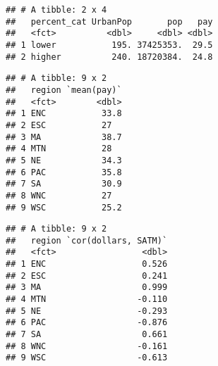 \documentclass[
]{article}
\newenvironment{Shaded}{\begin{snugshade}}{\end{snugshade}}
\newcommand{\KeywordTok}[1]{\textcolor[rgb]{0.13,0.29,0.53}{\textbf{#1}}}
\newcommand{\NormalTok}[1]{#1}
\newcommand{\OperatorTok}[1]{\textcolor[rgb]{0.81,0.36,0.00}{\textbf{#1}}}
\newcommand{\StringTok}[1]{\textcolor[rgb]{0.31,0.60,0.02}{#1}}
\begin{document}
\begin{Shaded}
\end{Shaded}

\begin{verbatim}
## # A tibble: 2 x 4
##   percent_cat UrbanPop       pop   pay
##   <fct>          <dbl>     <dbl> <dbl>
## 1 lower           195. 37425353.  29.5
## 2 higher          240. 18720384.  24.8
\end{verbatim}

\begin{Shaded}
\end{Shaded}

\begin{verbatim}
## # A tibble: 9 x 2
##   region `mean(pay)`
##   <fct>        <dbl>
## 1 ENC           33.8
## 2 ESC           27  
## 3 MA            38.7
## 4 MTN           28  
## 5 NE            34.3
## 6 PAC           35.8
## 7 SA            30.9
## 8 WNC           27  
## 9 WSC           25.2
\end{verbatim}

\begin{Shaded}
\end{Shaded}

\begin{verbatim}
## # A tibble: 9 x 2
##   region `cor(dollars, SATM)`
##   <fct>                 <dbl>
## 1 ENC                   0.526
## 2 ESC                   0.241
## 3 MA                    0.999
## 4 MTN                  -0.110
## 5 NE                   -0.293
## 6 PAC                  -0.876
## 7 SA                    0.661
## 8 WNC                  -0.161
## 9 WSC                  -0.613
\end{verbatim}
\end{document}
